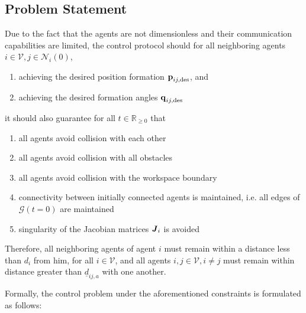 \subsection{Problem Statement}
Due to the fact that the agents are not dimensionless and their communication
capabilities are limited, the control protocol should for all neighboring
agents $i \in \mathcal{V}, j \in \mathcal{N}_i(0)$,

\begin{enumerate}
  \item achieving the desired position formation $\bm{\mathbf{p}}_{ij, \text{des}}$, and
  \item achieving the desired formation angles $\bm{\mathbf{q}}_{ij, \text{des}}$
\end{enumerate}

it should also guarantee for all $t\in\mathbb{R}_{\geq 0}$ that

\begin{enumerate}
  \item all agents avoid collision with each other
  \item all agents avoid collision with all obstacles
  \item all agents avoid collision with the workspace boundary
  \item connectivity between initially connected agents is maintained,
    i.e. all edges of $\mathcal{G}(t=0)$ are maintained
  \item singularity of the Jacobian matrices $\bm{\mathit{J}}_i$ is avoided
\end{enumerate}

Therefore, all neighboring agents of agent $i$ must remain within a distance
less than $d_i$ from him, for all $i \in \mathcal{V}$,
and all agents $i, j\in \mathcal{V}, i \neq j$ must remain within distance
greater than $\underline{d}_{ij,a}$ with one another.

Formally, the control problem under the aforementioned constraints is
formulated as follows:

